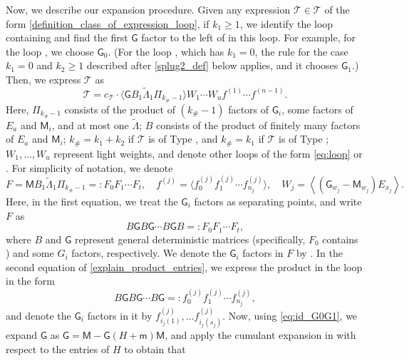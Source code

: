 \documentclass[10pt,reqno]{amsart}
\numberwithin{equation}{section}
\numberwithin{figure}{section}
\newcommand{\rmnum}[1]{\uppercase\expandafter{\romannumeral #1}}
\theoremstyle{plain} %
\theoremstyle{definition} %
\newcommand{\wt}{\widetilde}
\newcommand{\cG}{{\mathcal G}}
\newcommand{\cT}{\mathcal T}
\newcommand{\sG}{\mathsf G}
\newcommand{\sM}{\mathsf M}
\newcommand{\smm}{\mathsf m}
\newcommand{\scT}{{\mathscr{T}}}
\renewcommand{\geq}{\ge}
\newcommand{\pa}[1]{\left({#1}\right)}
\newcommand{\avg}[1]{\langle #1 \rangle}
\newcommand{\tLambda}{{\wt{\Lambda}}}
\newcommand{\tl}{\tLambda}
\numberwithin{equation}{section}
\begin{document}
    Now, we describe our expansion procedure. 
    Given any expression $\cT\in \scT$ of the form \eqref{definition_class_of_expression_loop}, if $k_1\geq 1$, we identify the loop containing \smash{$\tl_1$} and find the first $\sG$ factor to the left of \smash{$\tl_1$} in this loop. For example, for the loop \smash{$\avg{\sG_0\tl_1\sG_1\tl_2}$}, we choose $\sG_0$. (For the loop \smash{$\avg{\sM_0\tl_1\sG_1\tl_2}$}, which has $k_1=0$, the rule for the case $k_1=0$ and $k_2\ge 1$ described after \eqref{splug2_def} below applies, and it chooses $\sG_1$.) Then, we express $\cT$ as 
    \begin{equation}\label{explicit_cT}
        \cT=c_{\cT} \cdot \avg{ \sG B_1 \tLambda_1 \Pi_{k_{\#}-1}} W_1 \cdots W_u f^{(1)} \cdots f^{(n-1)}.
    \end{equation}
    Here, $\Pi_{k_{\#}-1}$ consists of the product of $(k_{\#}-1)$ factors of $\sG_i$, some factors of $E_{a}$ and $\sM_i$, and at most one $\tLambda$; $B$ consists of the product of finitely many factors of $E_{a}$ and $\sM_i$; $k_{\#}=k_1+k_2$ if $\cT$ is of Type \rmnum{1}, and $k_{\#}=k_1$ if $\cT$ is of Type \rmnum{2}; $W_1, \ldots, W_u$ represent light weights, and  denote other loops of the form \eqref{eq:loop} or \smash{$\avg{\cG^{\pa{k_2}}\tl_2}$}. For simplicity of notation, we denote 
    \begin{equation}\label{explain_product_entries}
        F=\sM B_1 \tLambda_1 \Pi_{k_\#-1}=: F_0F_1 \cdots F_t, \quad f^{(j)}=\avg{ f_0^{(j)} f_1^{(j)} \cdots f_{n_j}^{(j)}}, \quad  W_j=\left\langle\left(\sG_{w_j}-\sM_{w_j}\right) E_{x_j}\right\rangle.
    \end{equation}
    Here, in the first equation, we treat the $\sG_i$ factors as separating points, and write $F$ as \[B\sG B\sG\cdots B\sG B=:F_0F_1\cdots F_t,\] where $B$ and $\sG$ represent general deterministic matrices (specifically, $F_0$ contains \smash{$\tLambda_1$}) and some $G_i$ factors, respectively. We denote the $\sG_i$ factors in $F$ by \smash{$F_{i\pa{1}}, \ldots, F_{i\pa{k_{\#}-1}}$}. 
    In the second equation of \eqref{explain_product_entries}, we express the product in the loop \smash{$f^{\pa{j}}$} in the form \[B\sG B\sG \cdots B\sG=:f_0^{(j)} f_1^{(j)} \cdots f_{n_j}^{(j)},\] and denote the $\sG_i$ factors in it by $f_{i_j\pa{1}}^{(j)}, \ldots f_{i_j\pa{s_j}}^{(j)}$. 
    Now, using \eqref{eq:id_G0G1}, we expand $\sG$ as $\sG=\sM-\sG\pa{H+\smm}\sM$, and apply the cumulant expansion in  with respect to the entries of $H$ to obtain that 
\end{document}
